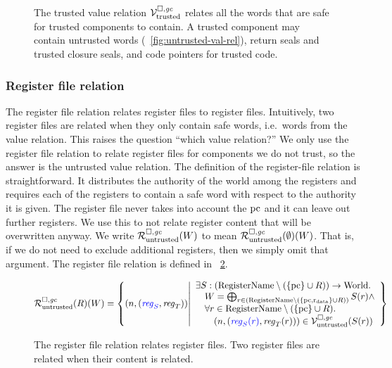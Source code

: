 \begin{jversion}
\begin{figure}
\caption{The trusted value relation $\mathcal{V}^{\square,\mathit{gc}}_{\mathrm{trusted}}$ relates all the words that are safe for trusted components to contain. A trusted component may contain untrusted words (\figurename~\ref{fig:untrusted-val-rel}), return seals and trusted closure seals, and code pointers for trusted code. }
\label{fig:trusted-val-rel}
\end{figure}
\subsubsection{Register file relation}
The register file relation relates \srccm{} register files to \trgcm{} register files.
Intuitively, two register files are related when they only contain safe words, i.e.\ words from the value relation.
This raises the question ``which value relation?''
We only use the register file relation to relate register files for components we do not trust, so the answer is the untrusted value relation.
The definition of the register-file relation is straightforward.
It distributes the authority of the world among the registers and requires each of the registers to contain a safe word with respect to the authority it is given.
The register file never takes into account the $\mathrm{pc}$ and it can leave out further registers.
We use this to not relate register content that will be overwritten anyway.
We write $\mathcal{R}^{\square,\mathit{gc}}_{\mathrm{untrusted}}(W)$ to mean $\mathcal{R}^{\square,\mathit{gc}}_{\mathrm{untrusted}}(\emptyset)(W)$.
That is, if we do not need to exclude additional registers, then we simply omit that argument.
The register file relation is defined in \figurename~\ref{fig:reg-file-rel}.

\begin{figure}
  \centering
  \[
  \lrr(R)(W) = \left\{ \npair{\stpair{\reg}{\reg}} \middle|
    \begin{array}{l}
      \exists S : (\RegName \setminus (\{\pcreg \} \cup R))\fun \World \ldotp \\
      \quad W = \bigoplus_{r \in (\RegName\setminus (\{\pcreg,\rdata \} \cup R))} S(r) \wedge \\
      \quad \forall r \in \RegName \setminus (\{\pcreg \} \cup R)\ldotp\\
      \qquad\npair{\stpair[.]{\src{\reg_S(r)}}{\reg_T(r)}} \in \lrv(S(r))
    \end{array}
            \right\}
\]
\caption{The register file relation relates register files. Two register files are related when their content is related.}
\label{fig:reg-file-rel}
\end{figure}


\end{jversion}
